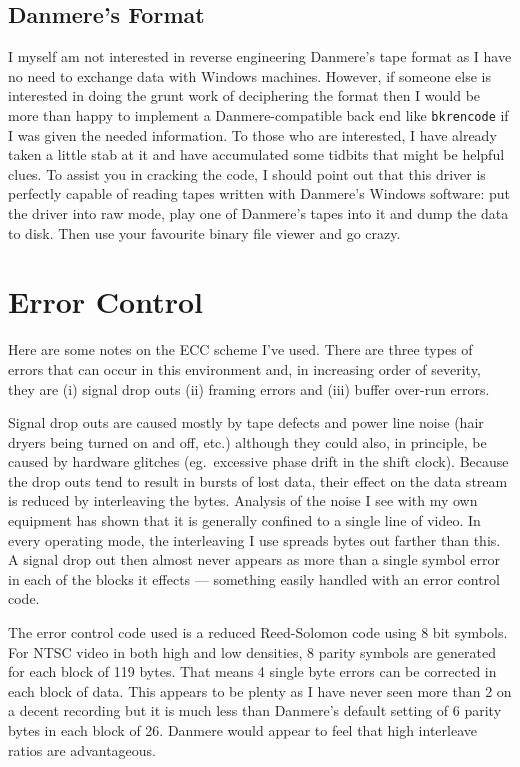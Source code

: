 \documentclass{article}
\begin{document}
\subsection{Danmere's Format}

I myself am not interested in reverse engineering Danmere's tape format as
I have no need to exchange data with Windows machines.  However, if someone
else is interested in doing the grunt work of deciphering the format then I
would be more than happy to implement a Danmere-compatible back end like
\texttt{bkrencode} if I was given the needed information.  To those who are
interested, I have already taken a little stab at it and have accumulated
some tidbits that might be helpful clues.  To assist you in cracking the
code, I should point out that this driver is perfectly capable of reading
tapes written with Danmere's Windows software:  put the driver into raw
mode, play one of Danmere's tapes into it and dump the data to disk.  Then
use your favourite binary file viewer and go crazy.


\section{Error Control}

Here are some notes on the ECC scheme I've used. There are three types of
errors that can occur in this environment and, in increasing order of
severity, they are (i) signal drop outs (ii) framing errors and (iii)
buffer over-run errors.

Signal drop outs are caused mostly by tape defects and power line noise
(hair dryers being turned on and off, etc.) although they could also, in
principle, be caused by hardware glitches (eg.\ excessive phase drift in
the shift clock).  Because the drop outs tend to result in bursts of lost
data, their effect on the data stream is reduced by interleaving the bytes.
Analysis of the noise I see with my own equipment has shown that it is
generally confined to a single line of video.  In every operating mode, the
interleaving I use spreads bytes out farther than this.  A signal drop out
then almost never appears as more than a single symbol error in each of the
blocks it effects --- something easily handled with an error control code.

The error control code used is a reduced Reed-Solomon code using 8 bit
symbols.  For NTSC video in both high and low densities, 8 parity symbols
are generated for each block of 119 bytes.  That means 4 single byte errors
can be corrected in each block of data.  This appears to be plenty as I
have never seen more than 2 on a decent recording but it is much less than
Danmere's default setting of 6 parity bytes in each block of 26.  Danmere
would appear to feel that high interleave ratios are advantageous.
\end{document}
